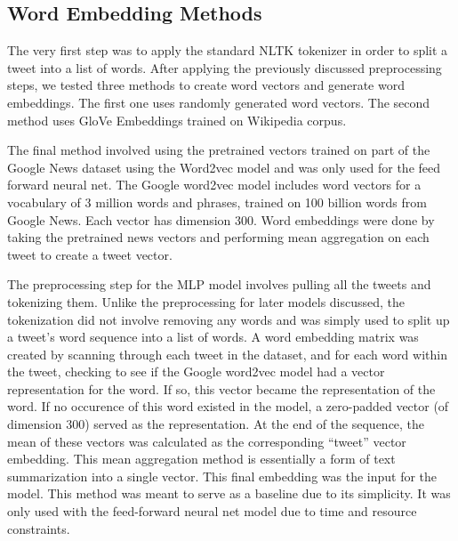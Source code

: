 \documentclass[11pt,a4paper]{article}
\begin{document}
	\subsection{Word Embedding Methods}
	The very first step was to apply the standard NLTK tokenizer in order to split a tweet into a list of words. After applying the previously discussed preprocessing steps, we tested three methods to create word vectors and generate word embeddings. The first one uses randomly generated word vectors. The second method uses GloVe Embeddings trained on Wikipedia corpus. 

	\par
	The final method involved using the pretrained vectors trained on part of the Google News dataset using the Word2vec model and was only used for the feed forward neural net. The Google word2vec model includes word vectors for a vocabulary of 3 million words and phrases, trained on 100 billion words from Google News. Each vector has dimension 300. Word embeddings were done by taking the pretrained news vectors and performing mean aggregation on each tweet to create a tweet vector. 
	\par
	The preprocessing step for the MLP model involves pulling all the tweets and tokenizing them. Unlike the preprocessing for later models discussed, the tokenization did not involve removing any words and was simply used to split up a tweet’s word sequence into a list of words. A word embedding matrix was created by scanning through each tweet in the dataset, and for each word within the tweet, checking to see if the Google word2vec model had a vector representation for the word. If so, this vector became the representation of the word. If no occurence of this word existed in the model, a zero-padded vector (of dimension 300) served as the representation. At the end of the sequence, the mean of these vectors was calculated as the corresponding “tweet” vector embedding. This mean aggregation method is essentially a form of text summarization into a single vector. This final embedding was the input for the model. This method was meant to serve as a baseline due to its simplicity. It was only used with the feed-forward neural net model due to time and resource constraints.
\end{document}
